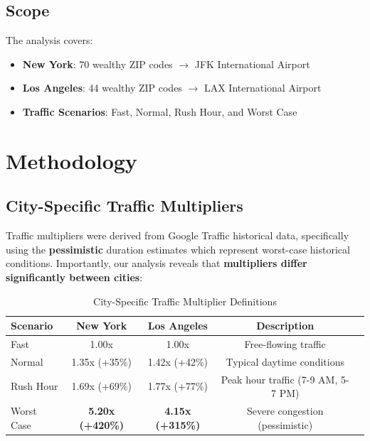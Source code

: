 \documentclass[12pt,a4paper]{article}
\begin{document}
\subsection{Scope}

The analysis covers:
\begin{itemize}
    \item \textbf{New York}: 70 wealthy ZIP codes $\rightarrow$ JFK International Airport
    \item \textbf{Los Angeles}: 44 wealthy ZIP codes $\rightarrow$ LAX International Airport
    \item \textbf{Traffic Scenarios}: Fast, Normal, Rush Hour, and Worst Case
\end{itemize}

\section{Methodology}

\subsection{City-Specific Traffic Multipliers}

Traffic multipliers were derived from Google Traffic historical data, specifically using the \textbf{pessimistic} duration estimates which represent worst-case historical conditions. Importantly, our analysis reveals that \textbf{multipliers differ significantly between cities}:

\begin{table}[H]
\centering
\caption{City-Specific Traffic Multiplier Definitions}
\begin{tabular}{lcccc}
\toprule
\textbf{Scenario} & \textbf{New York} & \textbf{Los Angeles} & \textbf{Description} \\
\midrule
Fast & 1.00x & 1.00x & Free-flowing traffic \\
Normal & 1.35x (+35\%) & 1.42x (+42\%) & Typical daytime conditions \\
Rush Hour & 1.69x (+69\%) & 1.77x (+77\%) & Peak hour traffic (7-9 AM, 5-7 PM) \\
\rowcolor{lared!20} Worst Case & \textbf{5.20x (+420\%)} & \textbf{4.15x (+315\%)} & Severe congestion (pessimistic) \\
\bottomrule
\end{tabular}
\end{table}
\end{document}
